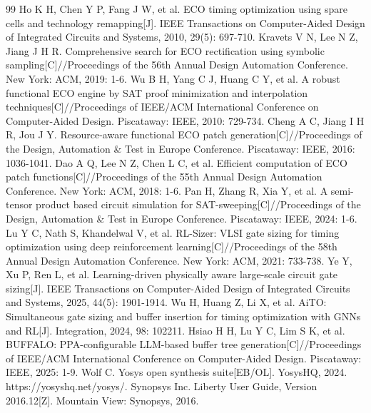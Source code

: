 \documentclass[twocolumn,10pt,fontset=windows]{ctexart}
\begin{document}
\renewcommand{\refname}{参考文献}
\footnotesize
\linespread{0.95}\selectfont
\balance
\begin{thebibliography}{99}
 Ho K H, Chen Y P, Fang J W, et al. ECO timing optimization using spare cells and technology remapping[J]. IEEE Transactions on Computer-Aided Design of Integrated Circuits and Systems, 2010, 29(5): 697-710.
 Kravets V N, Lee N Z, Jiang J H R. Comprehensive search for ECO rectification using symbolic sampling[C]//Proceedings of the 56th Annual Design Automation Conference. New York: ACM, 2019: 1-6.
 Wu B H, Yang C J, Huang C Y, et al. A robust functional ECO engine by SAT proof minimization and interpolation techniques[C]//Proceedings of IEEE/ACM International Conference on Computer-Aided Design. Piscataway: IEEE, 2010: 729-734.
 Cheng A C, Jiang I H R, Jou J Y. Resource-aware functional ECO patch generation[C]//Proceedings of the Design, Automation \& Test in Europe Conference. Piscataway: IEEE, 2016: 1036-1041.
 Dao A Q, Lee N Z, Chen L C, et al. Efficient computation of ECO patch functions[C]//Proceedings of the 55th Annual Design Automation Conference. New York: ACM, 2018: 1-6.
 Pan H, Zhang R, Xia Y, et al. A semi-tensor product based circuit simulation for SAT-sweeping[C]//Proceedings of the Design, Automation \& Test in Europe Conference. Piscataway: IEEE, 2024: 1-6.
 Lu Y C, Nath S, Khandelwal V, et al. RL-Sizer: VLSI gate sizing for timing optimization using deep reinforcement learning[C]//Proceedings of the 58th Annual Design Automation Conference. New York: ACM, 2021: 733-738.
 Ye Y, Xu P, Ren L, et al. Learning-driven physically aware large-scale circuit gate sizing[J]. IEEE Transactions on Computer-Aided Design of Integrated Circuits and Systems, 2025, 44(5): 1901-1914.
 Wu H, Huang Z, Li X, et al. AiTO: Simultaneous gate sizing and buffer insertion for timing optimization with GNNs and RL[J]. Integration, 2024, 98: 102211.
 Hsiao H H, Lu Y C, Lim S K, et al. BUFFALO: PPA-configurable LLM-based buffer tree generation[C]//Proceedings of IEEE/ACM International Conference on Computer-Aided Design. Piscataway: IEEE, 2025: 1-9.
 Wolf C. Yosys open synthesis suite[EB/OL]. YosysHQ, 2024. https://yosyshq.net/yosys/.
 Synopsys Inc. Liberty User Guide, Version 2016.12[Z]. Mountain View: Synopsys, 2016.

\end{thebibliography}
\end{document}
